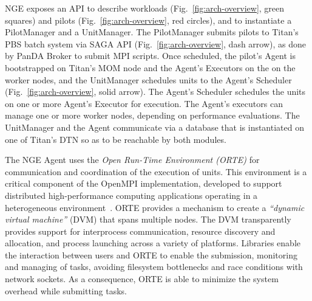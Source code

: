 NGE exposes an API to describe workloads (Fig.~\ref{fig:arch-overview}, green
squares) and pilots (Fig.~\ref{fig:arch-overview}, red circles), and to
instantiate a PilotManager and a UnitManager.   The PilotManager submits
pilots to Titan's PBS  batch system via SAGA API (Fig.~\ref{fig:arch-overview}, dash arrow), as done by PanDA Broker to submit MPI scripts. Once
scheduled, the pilot's Agent is bootstrapped on Titan's MOM node and
the Agent's Executors on the on the worker
nodes, and the UnitManager schedules units to the Agent's Scheduler
(Fig.~\ref{fig:arch-overview}, solid arrow). The Agent's Scheduler schedules
the units on one or more Agent's Executor for execution. The Agent's executors
can manage one or more worker nodes, depending on performance evaluations. The
UnitManager and the Agent communicate via a database that is instantiated on
one of Titan's DTN so as to be reachable by both modules.

The NGE Agent uses the \emph{Open Run-Time Environment (ORTE)} for
communication and coordination of the execution of units. This environment is
a critical component of the OpenMPI implementation, developed to support
distributed high-performance computing applications operating in a
heterogeneous environment~\cite{castain05:_open_rte, cug-2016}. ORTE provides
a mechanism to create a \emph{``dynamic virtual machine''} (DVM) that spans
multiple nodes. The DVM transparently provides support for interprocess
communication, resource discovery and allocation, and process launching across
a variety of platforms. Libraries enable the interaction between users and
ORTE to enable the submission, monitoring and managing of tasks, avoiding
filesystem bottlenecks and race conditions with network sockets. As a
consequence, ORTE is able to minimize the system overhead while submitting
tasks.
